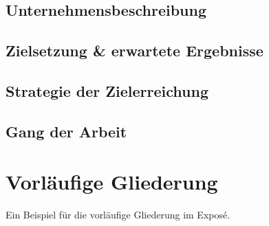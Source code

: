 \documentclass[a4paper, 12pt, headsepline=true]{scrartcl} %
\begin{document}
\subsection{Unternehmensbeschreibung}

\subsection{Zielsetzung \& erwartete Ergebnisse}

\subsection{Strategie der Zielerreichung}

\subsection{Gang der Arbeit}

\section{Vorläufige Gliederung}

Ein Beispiel für die vorläufige Gliederung im Exposé.
\end{document}
